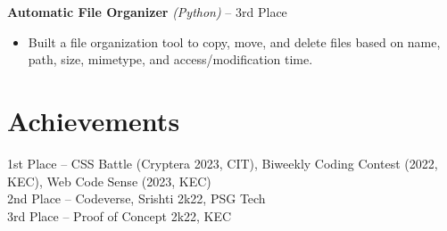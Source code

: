 \documentclass[10pt,letterpaper]{article}
\newcommand{\resumeItem}[1]{\item #1}
\newenvironment{resumeList}{\begin{itemize}[leftmargin=16pt, itemsep=0pt, topsep=1pt, parsep=0pt]}{\end{itemize}}
\begin{document}
\vspace{1pt}
\textbf{Automatic File Organizer} \textit{(Python)} -- 3rd Place \\[0pt]
\begin{resumeList}
  \resumeItem{Built a file organization tool to copy, move, and delete files based on name, path, size, mimetype, and access/modification time.}
\end{resumeList}

\section*{Achievements}
1st Place -- CSS Battle (Cryptera 2023, CIT), Biweekly Coding Contest (2022, KEC), Web Code Sense (2023, KEC) \\
2nd Place -- Codeverse, Srishti 2k22, PSG Tech \\
3rd Place -- Proof of Concept 2k22, KEC
\end{document}

